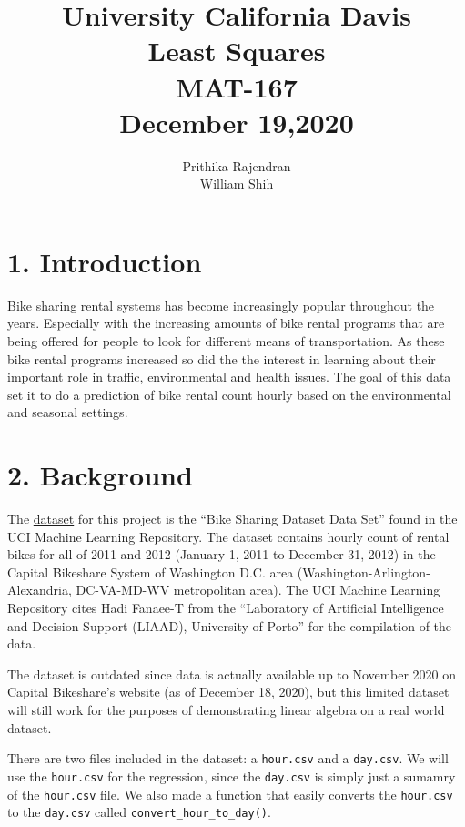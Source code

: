 \documentclass[
]{article}
\title{University California Davis \\ Least Squares \\ MAT-167 \\ December 19,2020}
\author{Prithika Rajendran\\  William Shih
}
\date{\vspace{-2.5em}}
\begin{document}
\maketitle
\newpage
\tableofcontents
\newpage

\hypertarget{introduction}{%
\section{1. Introduction}\label{introduction}}
Bike sharing rental systems has become increasingly popular throughout the years. Especially with the increasing amounts of bike rental programs that are being offered for people to look for different means of transportation. As these bike rental programs increased so did the the interest in learning about their important role in traffic, environmental and health issues. The goal of this data set it to do a prediction of bike rental count hourly based on the environmental and seasonal settings.

\hypertarget{Background}{%
\section{2. Background}\label{Background}}
The \color{blue}
\href{https://www.archive.ics.uci.edu/ml/datasets/Bike+Sharing+Dataset}{dataset}
\color{black} for this project is the ``Bike Sharing Dataset Data Set''
found in the UCI Machine Learning Repository. The dataset contains
hourly count of rental bikes for all of 2011 and 2012 (January 1, 2011
to December 31, 2012) in the Capital Bikeshare System of Washington D.C.
area (Washington-Arlington-Alexandria, DC-VA-MD-WV metropolitan area).
The UCI Machine Learning Repository cites Hadi Fanaee-T from the
``Laboratory of Artificial Intelligence and Decision Support (LIAAD),
University of Porto'' for the compilation of the data.

The dataset is outdated since data is actually available up to November
2020 on Capital Bikeshare's website (as of December 18, 2020), but this
limited dataset will still work for the purposes of demonstrating linear
algebra on a real world dataset.

There are two files included in the dataset: a \texttt{hour.csv} and a
\texttt{day.csv}. We will use the \texttt{hour.csv} for the regression,
since the \texttt{day.csv} is simply just a sumamry of the
\texttt{hour.csv} file. We also made a function that easily converts the
\texttt{hour.csv} to the \texttt{day.csv} called
\texttt{convert\_hour\_to\_day()}.
\end{document}
